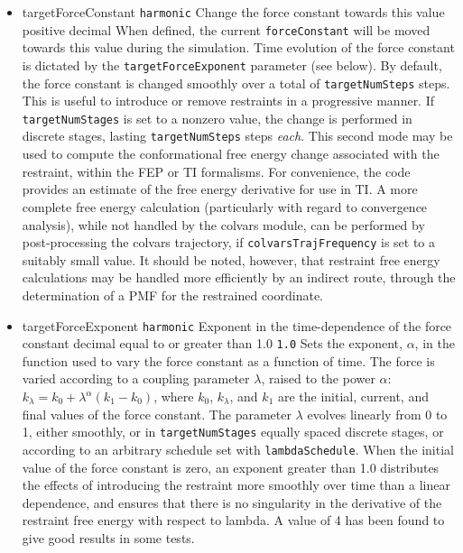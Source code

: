\begin{itemize}

\item %
  \key
    {targetForceConstant}{%
    \texttt{harmonic}}{%
    Change the force constant towards this value}{%
    positive decimal}{%
    When defined, the current \texttt{forceConstant} will be moved towards
    this value during the simulation. Time evolution of the force constant
    is dictated by the \texttt{targetForceExponent} parameter (see below).
    By default, the force constant is changed smoothly over a total of 
    \texttt{targetNumSteps} steps. This is useful to introduce or
    remove restraints in a progressive manner.
    If \texttt{targetNumStages} is set to a nonzero value, the
    change is performed in discrete stages, lasting \texttt{targetNumSteps}
    steps \emph{each}. This second mode may be used to compute the
    conformational free energy change associated with the restraint, within
    the FEP or TI formalisms. For convenience, the code provides an estimate
    of the free energy derivative for use in TI. A more complete free energy
    calculation (particularly with regard to convergence analysis),
    while not handled by the colvars module, can be performed by post-processing
    the colvars trajectory, if \texttt{colvarsTrajFrequency} is set to a
    suitably small value. It should be noted, however, that restraint
    free energy calculations may be handled more efficiently by an
    indirect route, through the
    determination of a PMF for the restrained coordinate.\cite{Deng2009}}

\item %
  \keydef
    {targetForceExponent}{%
      \texttt{harmonic}}{%
      Exponent in the time-dependence of the force constant}{%
      decimal equal to or greater than 1.0}{%
    \texttt{1.0}}{%
    Sets the exponent, $\alpha$, in the function used to vary the force
    constant as a function of time. The force is varied according to a
    coupling parameter $\lambda$, raised to the power $\alpha$:
    $ k_\lambda = k_0 + \lambda^\alpha (k_1 - k_0)$, where $k_0$,
    $k_\lambda$, and $k_1$ are the initial, current, and final values
    of the force constant. The parameter $\lambda$ evolves linearly from
    0 to 1, either smoothly, or in \texttt{targetNumStages} equally spaced
    discrete stages, or according to an arbitrary schedule set with
    \texttt{lambdaSchedule}.
    When the initial value of the force constant is zero,
    an exponent greater than 1.0 distributes the effects of introducing the
    restraint more smoothly over time than a linear dependence, and
    ensures that there is no singularity in the derivative of the
    restraint free energy with respect to lambda. A value of 4 has
    been found to give good results in some tests.}


\end{itemize}
